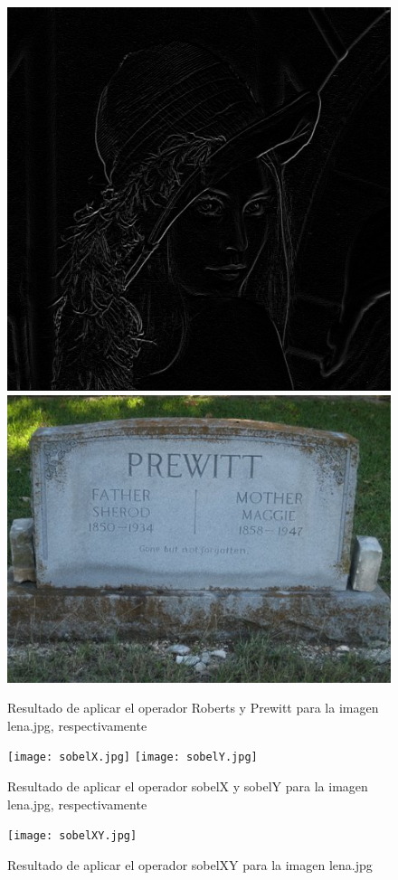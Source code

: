 \documentclass[11pt, a4paper]{article}
\begin{document}
\begin{figure}[ht] %
\centering
\includegraphics[scale=0.30]{roberts.jpg}\hspace{1cm}
\includegraphics[scale=0.30]{prewitt.jpg}
\caption{Resultado de aplicar el operador Roberts y Prewitt para la imagen lena.jpg, respectivamente}
\end{figure}

\begin{figure}[ht] %
\centering
\texttt{[image: sobelX.jpg]}\hspace{1cm}
\texttt{[image: sobelY.jpg]}
\caption{Resultado de aplicar el operador sobelX y sobelY para la imagen lena.jpg, respectivamente}
\end{figure}

\begin{figure}[ht] %
\centering
\texttt{[image: sobelXY.jpg]}
\caption{Resultado de aplicar el operador sobelXY para la imagen lena.jpg}
\end{figure}
\end{document}

